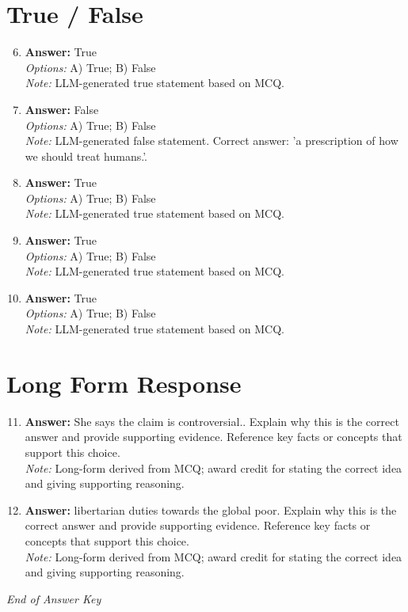 \documentclass[12pt]{article}
\begin{document}
\section*{True / False}
\begin{enumerate}[label=\arabic*.]
\setcounter{enumi}{5}
\item \textbf{Answer:} True
\\ \textit{Options:} A) True; B) False
\\ \textit{Note:} LLM-generated true statement based on MCQ.
\item \textbf{Answer:} False
\\ \textit{Options:} A) True; B) False
\\ \textit{Note:} LLM-generated false statement. Correct answer: 'a prescription of how we should treat humans.'.
\item \textbf{Answer:} True
\\ \textit{Options:} A) True; B) False
\\ \textit{Note:} LLM-generated true statement based on MCQ.
\item \textbf{Answer:} True
\\ \textit{Options:} A) True; B) False
\\ \textit{Note:} LLM-generated true statement based on MCQ.
\item \textbf{Answer:} True
\\ \textit{Options:} A) True; B) False
\\ \textit{Note:} LLM-generated true statement based on MCQ.
\end{enumerate}

\section*{Long Form Response}
\begin{enumerate}[label=\arabic*.]
\setcounter{enumi}{10}
\item \textbf{Answer:} She says the claim is controversial.. Explain why this is the correct answer and provide supporting evidence. Reference key facts or concepts that support this choice.
\\ \textit{Note:} Long-form derived from MCQ; award credit for stating the correct idea and giving supporting reasoning.
\item \textbf{Answer:} libertarian duties towards the global poor. Explain why this is the correct answer and provide supporting evidence. Reference key facts or concepts that support this choice.
\\ \textit{Note:} Long-form derived from MCQ; award credit for stating the correct idea and giving supporting reasoning.
\end{enumerate}

\vfill
\noindent\textit{End of Answer Key}
\end{document}
